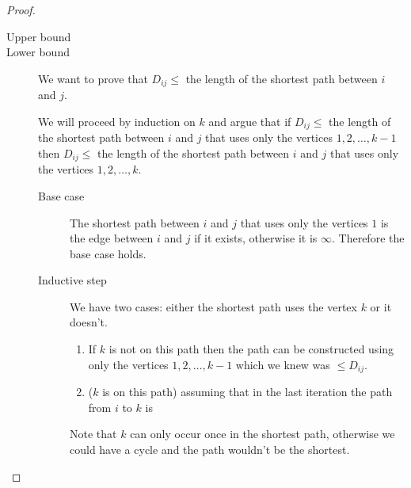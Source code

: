 \documentclass[12pt]{extarticle}
\begin{document}
\begin{proof}
    \skiplineafterproof
    \begin{description}
        \item[Upper bound]
        \item[Lower bound]
            We want to prove that $D_{ij} \leq$ the length of the shortest path between $i$ and $j$.

            We will proceed by induction on $k$ and argue that if $D_{ij} \leq$ the length of the shortest path between $i$ and $j$ that uses only the vertices $1, 2, \ldots, k-1$ then $D_{ij} \leq$ the length of the shortest path between $i$ and $j$ that uses only the vertices $1, 2, \ldots, k$.

            \begin{description}
                \item[Base case] The shortest path between $i$ and $j$ that uses only the vertices $1$ is the edge between $i$ and $j$ if it exists, otherwise it is $\infty$. Therefore the base case holds.
                \item[Inductive step]
                    We have two cases: either the shortest path uses the vertex $k$ or it doesn't.

                    \begin{enumerate}[label=(\roman*)]
                        \item If $k$ is not on this path then the path can be constructed using only the vertices $1, 2, \ldots, k-1$ which we knew was $\leq D_{ij}$.
                        \item ($k$ is on this path) assuming that in the last iteration the path from $i$ to $k$ is
                    \end{enumerate}

                    Note that $k$ can only occur once in the shortest path, otherwise we could have a cycle and the path wouldn't be the shortest.
            \end{description}

    \end{description}

\end{proof}
\end{document}
